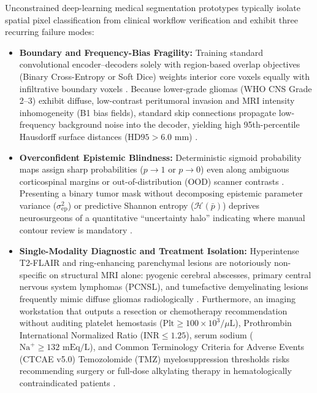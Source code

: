 \documentclass[journal,onecolumn,10pt]{IEEEtran}
\begin{document}
Unconstrained deep-learning medical segmentation prototypes typically isolate spatial pixel classification from clinical workflow verification and exhibit three recurring failure modes:
\begin{itemize}
    \item \textbf{Boundary and Frequency-Bias Fragility:} Training standard convolutional encoder--decoders solely with region-based overlap objectives (Binary Cross-Entropy or Soft Dice) weights interior core voxels equally with infiltrative boundary voxels \cite{ronneberger2015unet, milletari2016vnet}. Because lower-grade gliomas (WHO CNS Grade 2--3) exhibit diffuse, low-contrast peritumoral invasion and MRI intensity inhomogeneity (B1 bias fields), standard skip connections propagate low-frequency background noise into the decoder, yielding high 95th-percentile Hausdorff surface distances ($\text{HD95} > 6.0\text{ mm}$) \cite{kervadec2021boundary, karimi2020hd}.
    \item \textbf{Overconfident Epistemic Blindness:} Deterministic sigmoid probability maps assign sharp probabilities ($p \to 1$ or $p \to 0$) even along ambiguous corticospinal margins or out-of-distribution (OOD) scanner contrasts \cite{guo2017calibration, kendall2017uncertainties}. Presenting a binary tumor mask without decomposing epistemic parameter variance ($\sigma_{\text{ep}}^2$) or predictive Shannon entropy ($\mathcal{H}(\bar{p})$) deprives neurosurgeons of a quantitative ``uncertainty halo'' indicating where manual contour review is mandatory \cite{gal2016dropout, zou2022tbrats}.
    \item \textbf{Single-Modality Diagnostic and Treatment Isolation:} Hyperintense T2-FLAIR and ring-enhancing parenchymal lesions are notoriously non-specific on structural MRI alone: pyogenic cerebral abscesses, primary central nervous system lymphomas (PCNSL), and tumefactive demyelinating lesions frequently mimic diffuse gliomas radiologically \cite{wen2010rano, arevalo2017gmu}. Furthermore, an imaging workstation that outputs a resection or chemotherapy recommendation without auditing platelet hemostasis ($\text{Plt} \ge 100 \times 10^3/\mu\text{L}$), Prothrombin International Normalized Ratio ($\text{INR} \le 1.25$), serum sodium ($\text{Na}^+ \ge 132\text{ mEq/L}$), and Common Terminology Criteria for Adverse Events (CTCAE v5.0) Temozolomide (TMZ) myelosuppression thresholds risks recommending surgery or full-dose alkylating therapy in hematologically contraindicated patients \cite{stupp2005radiotherapy, ctcae2017v5}.
\end{itemize}
\end{document}

